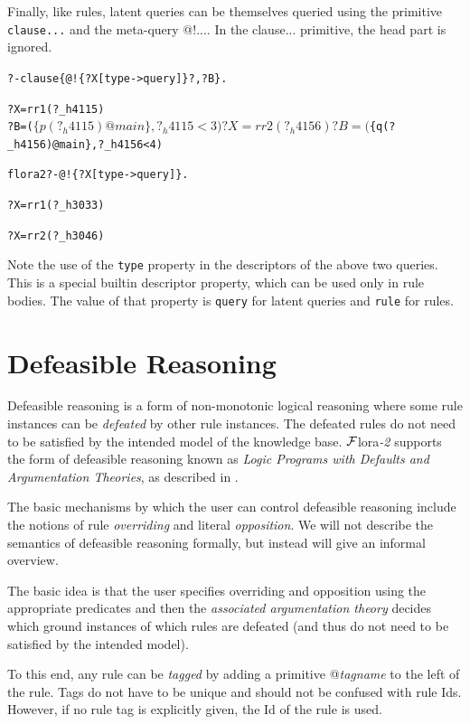\documentclass[11pt]{article}
\newcommand{\FLORA}{{\mbox{\sc ${\cal F}${lora}\rm\emph{-2}}}\xspace}
\newcommand{\FLSYSTEM}{\FLORA}
\newcommand{\prompt}{flora2 ?- }
\begin{document}
Finally, like rules, latent queries can be themselves queried using the
primitive \texttt{clause{...}}  and the meta-query @!{...}. In the
clause{...} primitive, the head part is ignored.
\begin{alltt}
  ?- clause\{@!\{?X[type->query]\} ?,?B\}.

  ?X = rr1(?_h4115)
  ?B = ($\{p(?_h4115)@main\}, ?_h4115 < 3)

  ?X = rr2(?_h4156)
  ?B = ($\{q(?_h4156)@main\}, ?_h4156 < 4)

  \prompt @!\{?X[type->query]\}.

  ?X = rr1(?_h3033)

  ?X = rr2(?_h3046)
\end{alltt}
Note the use of the \texttt{type} property in the descriptors of the above
two queries. This is a special builtin descriptor property, which can be
used only in rule bodies. The value of that property is \texttt{query} for
latent queries and \texttt{rule} for rules.  


\section{Defeasible Reasoning}
\label{sec-defeasible}

Defeasible reasoning is a form of non-monotonic logical reasoning where
some rule instances can be \emph{defeated} by other rule instances. The
defeated rules do not need to be satisfied by the intended model of the
knowledge base. \FLSYSTEM supports the form of defeasible reasoning known as
\emph{Logic Programs with Defaults and Argumentation Theories}, as
described in \cite{lpda-iclp-09}.  

The basic mechanisms by which the user can control defeasible
reasoning include the notions of rule \emph{overriding} and literal
\emph{opposition}.  We will not describe the semantics of defeasible
reasoning formally, but instead will give an informal overview.

The basic idea is that the user specifies overriding and
opposition using the appropriate predicates and then the \emph{associated
argumentation theory} decides which ground instances of which rules are
defeated (and thus do not need to be satisfied by the intended model).  

To this end, any rule can be \emph{tagged} by adding
a primitive @{\emph{tagname}} to the left of the rule. Tags do not have to
be unique and should not be confused with rule Ids. However, if no rule tag
is explicitly given, the Id of the rule is used.
\end{document}
